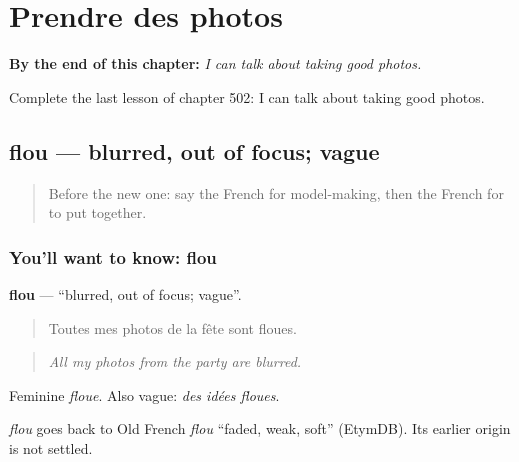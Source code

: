 
\chapter{Prendre des photos}
\label{ch:fr-prendre-des-photos}

\begin{chapteropening}
\textbf{By the end of this chapter:} \emph{I can talk about taking good photos.}

Complete the last lesson of chapter 502: I can talk about taking good photos.
\end{chapteropening}

\section[flou]{flou — blurred, out of focus; vague}

\label{lesson:FR-C502-flou}



\begin{quote}
Before the new one: say the French for model-making, then the French for to put together.
\end{quote}

\subsection*{You'll want to know: flou}
\textbf{flou} — \textquotedblleft{}blurred, out of focus; vague\textquotedblright{}.

\begin{quote}
Toutes mes photos de la fête sont floues.
\end{quote}

\begin{quote}
\emph{All my photos from the party are blurred.}
\end{quote}

Feminine \emph{floue}. Also vague: \emph{des idées floues}.

\begin{cousinweb}
\emph{flou} goes back to Old French \emph{flou} \textquotedblleft{}faded, weak, soft\textquotedblright{} (EtymDB). Its earlier origin is not settled.
\end{cousinweb}


